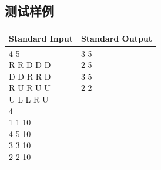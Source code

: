 \subsection*{测试样例}

\begin{table}[H]
\begin{tabularx}{\textwidth}{|X|X|}
    \hline
    \textbf{Standard Input} & \textbf{Standard Output} \\ 
    \hline 
    \tablecell{
        4 5 \\
        R R D D D \\
        D D R R D \\
        R U R U U \\
        U L L R U \\
        4 \\
        1 1 10 \\
        4 5 10 \\
        3 3 10 \\
        2 2 10 \\
    } & 
    \tablecell{3 5 \\
    2 5 \\
    3 5 \\
    2 2 \\ \\ \\ \\ \\ \\ \\} \\
    \hline
\end{tabularx}
\end{table}
